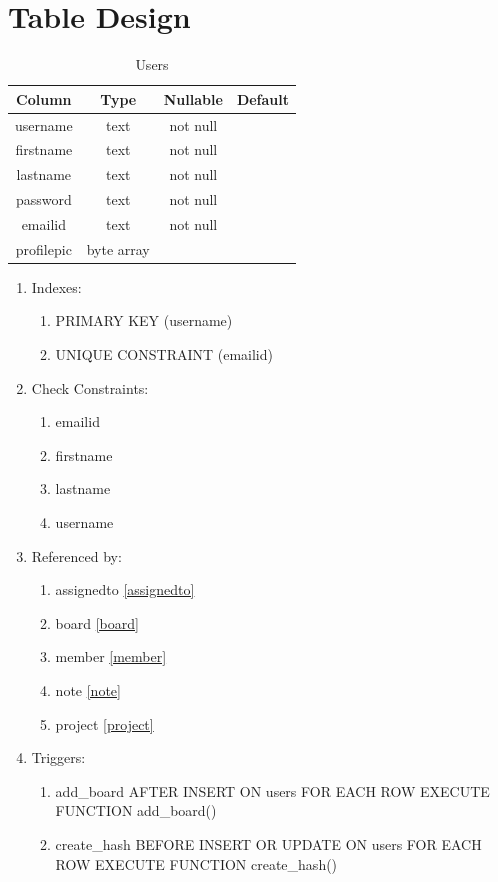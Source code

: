 \documentclass[conference,onecolumn]{IEEEtran}
\begin{document}
\section{Table Design}
\begin{table}[htbp]
  \caption{Users}
  \begin{center}
    \begin{tabular}{|c|c|c|c|}
      \hline
      \textbf{Column} & \textbf{Type} & \textbf{Nullable} & \textbf{Default}\\
      \hline
      username & text & not null & \\
      firstname & text & not null & \\
      lastname & text & not null & \\
      password & text & not null & \\
      emailid & text & not null & \\
      profilepic & byte array & & \\
      \hline
    \end{tabular}
    \begin{enumerate}
    \item Indexes:
      \begin{enumerate}
      \item PRIMARY KEY (username)
      \item UNIQUE CONSTRAINT (emailid)
      \end{enumerate}
    \item Check Constraints:
      \begin{enumerate}
      \item emailid
      \item firstname
      \item lastname
      \item username
      \end{enumerate}
    \item Referenced by:
      \begin{enumerate}
      \item assignedto \ref{assignedto}
      \item board \ref{board}
      \item member \ref{member}
      \item note \ref{note}
      \item project \ref{project}
      \end{enumerate}
    \item Triggers:
      \begin{enumerate}
      \item add\_board AFTER INSERT ON users FOR EACH ROW EXECUTE FUNCTION add\_board()
      \item create\_hash BEFORE INSERT OR UPDATE ON users FOR EACH ROW EXECUTE FUNCTION create\_hash()
      \end{enumerate}
    \end{enumerate}
    \label{users}
  \end{center}
\end{table}
\end{document}
